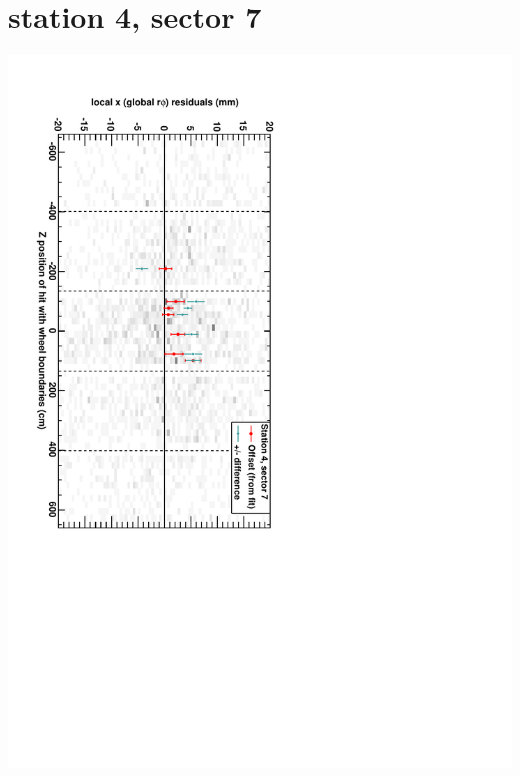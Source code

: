 \documentclass[compress]{beamer}
\begin{document}
\section*{station 4, sector 7}
\begin{frame} \vfill \mbox{\hspace{-1 cm}\includegraphics[height=1.2\linewidth, angle=90]{DTrphiVsZ_st4_sr07.pdf}} \end{frame}
\end{document}
